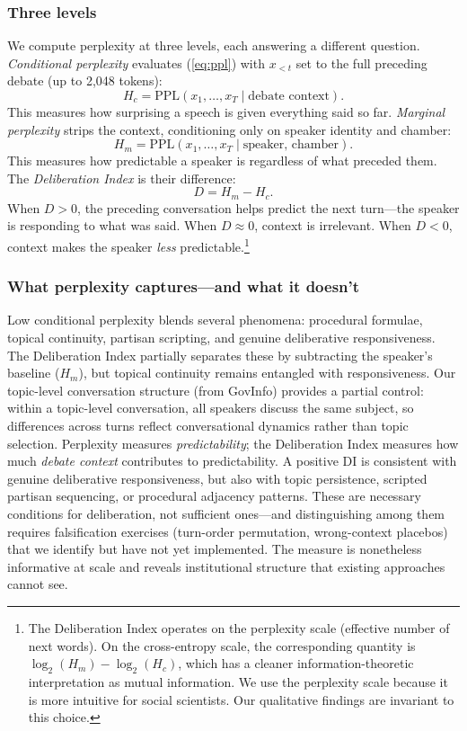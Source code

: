 \documentclass[12pt]{article}
\newcommand{\Hc}{H_c}
\newcommand{\Hm}{H_m}
\newcommand{\DI}{\mathit{D}}
\newcommand{\PPL}{\text{PPL}}
\begin{document}
\subsubsection*{Three levels}
We compute perplexity at three levels, each answering a different question. \textit{Conditional perplexity} evaluates (\ref{eq:ppl}) with $x_{<t}$ set to the full preceding debate (up to 2,048 tokens):
\begin{equation}
\Hc = \PPL(x_1, \ldots, x_T \mid \text{debate context}).
\end{equation}
This measures how surprising a speech is given everything said so far. \textit{Marginal perplexity} strips the context, conditioning only on speaker identity and chamber:
\begin{equation}
\Hm = \PPL(x_1, \ldots, x_T \mid \text{speaker, chamber}).
\end{equation}
This measures how predictable a speaker is regardless of what preceded them. The \textit{Deliberation Index} is their difference:
\begin{equation}
\DI = \Hm - \Hc.
\label{eq:di}
\end{equation}
When $\DI > 0$, the preceding conversation helps predict the next turn---the speaker is responding to what was said. When $\DI \approx 0$, context is irrelevant. When $\DI < 0$, context makes the speaker \textit{less} predictable.\footnote{The Deliberation Index operates on the perplexity scale (effective number of next words). On the cross-entropy scale, the corresponding quantity is $\log_2(\Hm) - \log_2(\Hc)$, which has a cleaner information-theoretic interpretation as mutual information. We use the perplexity scale because it is more intuitive for social scientists. Our qualitative findings are invariant to this choice.}

\subsubsection*{What perplexity captures---and what it doesn't}
Low conditional perplexity blends several phenomena: procedural formulae, topical continuity, partisan scripting, and genuine deliberative responsiveness. The Deliberation Index partially separates these by subtracting the speaker's baseline ($\Hm$), but topical continuity remains entangled with responsiveness. Our topic-level conversation structure (from GovInfo) provides a partial control: within a topic-level conversation, all speakers discuss the same subject, so differences across turns reflect conversational dynamics rather than topic selection. Perplexity measures \textit{predictability}; the Deliberation Index measures how much \textit{debate context} contributes to predictability. A positive DI is consistent with genuine deliberative responsiveness, but also with topic persistence, scripted partisan sequencing, or procedural adjacency patterns. These are necessary conditions for deliberation, not sufficient ones---and distinguishing among them requires falsification exercises (turn-order permutation, wrong-context placebos) that we identify but have not yet implemented. The measure is nonetheless informative at scale and reveals institutional structure that existing approaches cannot see.
\end{document}
